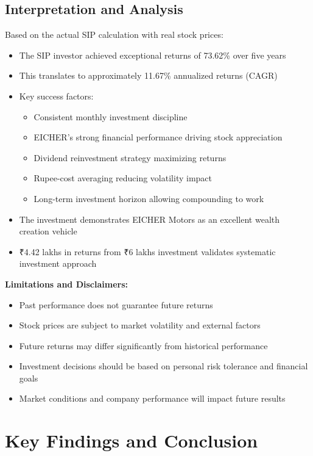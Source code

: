 \documentclass[8pt,a4paper]{article}
\begin{document}
\subsection{Interpretation and Analysis}

Based on the actual SIP calculation with real stock prices:
\begin{itemize}
    \item The SIP investor achieved exceptional returns of 73.62\% over five years
    \item This translates to approximately 11.67\% annualized returns (CAGR)
    \item Key success factors:
    \begin{itemize}
        \item Consistent monthly investment discipline
        \item EICHER's strong financial performance driving stock appreciation
        \item Dividend reinvestment strategy maximizing returns
        \item Rupee-cost averaging reducing volatility impact
        \item Long-term investment horizon allowing compounding to work
    \end{itemize}
    \item The investment demonstrates EICHER Motors as an excellent wealth creation vehicle
    \item ₹4.42 lakhs in returns from ₹6 lakhs investment validates systematic investment approach
\end{itemize}

\textbf{Limitations and Disclaimers:}
\begin{itemize}
    \item Past performance does not guarantee future returns
    \item Stock prices are subject to market volatility and external factors
    \item Future returns may differ significantly from historical performance
    \item Investment decisions should be based on personal risk tolerance and financial goals
    \item Market conditions and company performance will impact future results
\end{itemize}

\section{Key Findings and Conclusion}
\end{document}
